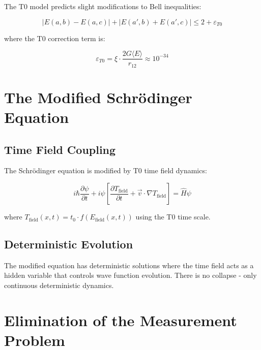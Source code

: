 \documentclass[12pt,a4paper]{report}
\begin{document}
	The T0 model predicts slight modifications to Bell inequalities:
	
	\begin{equation}
		|E(a,b) - E(a,c)| + |E(a',b) + E(a',c)| \leq 2 + \varepsilon_{T0}
	\end{equation}
	
	where the T0 correction term is:
	
	\begin{equation}
		\varepsilon_{T0} = \xi \cdot \frac{2G\langle E \rangle}{r_{12}} \approx 10^{-34}
	\end{equation}
	
	\section{The Modified Schrödinger Equation}
	\label{sec:modified_schrodinger}
	
	\subsection{Time Field Coupling}
	\label{subsec:time_field_coupling}
	
	The Schrödinger equation is modified by T0 time field dynamics:
	
	\begin{equation}
		\boxed{i \hbar \frac{\partial\psi}{\partial t} + i\psi\left[\frac{\partial T_{\text{field}}}{\partial t} + \vec{v} \cdot \nabla T_{\text{field}}\right] = \hat{H}\psi}
		\label{eq:modified_schrodinger}
	\end{equation}
	
	where $T_{\text{field}}(x,t) = t_0 \cdot f(E_{\text{field}}(x,t))$ using the T0 time scale.
	
	\subsection{Deterministic Evolution}
	\label{subsec:deterministic_evolution}
	
	The modified equation has deterministic solutions where the time field acts as a hidden variable that controls wave function evolution. There is no collapse - only continuous deterministic dynamics.
	
	\section{Elimination of the Measurement Problem}
	\label{sec:measurement_problem}
	
\end{document}
